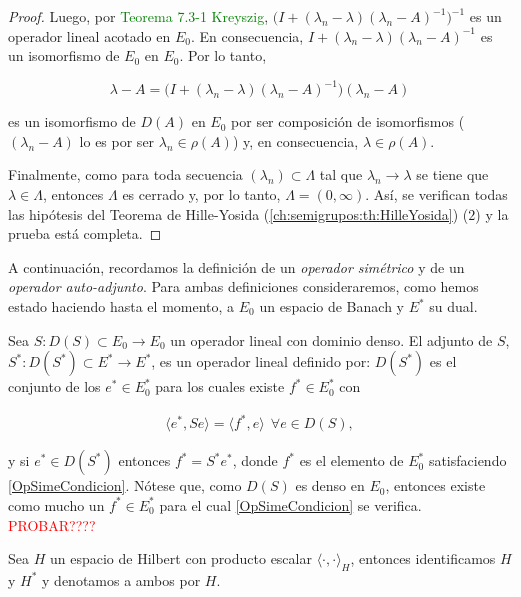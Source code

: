 \begin{proof}
    Luego, por \textcolor{green}{Teorema 7.3-1 Kreyszig}, $\big(I + (\lambda_n - \lambda)(\lambda_n - A)^{-1}\big)^{-1}$ es un operador lineal acotado en $E_0$. En consecuencia, $I + (\lambda_n - \lambda)(\lambda_n - A)^{-1}$ es un isomorfismo de $E_0$ en $E_0$. Por lo tanto,

    \[\lambda - A = \big(I + (\lambda_n - \lambda)(\lambda_n - A)^{-1} \big)(\lambda_n - A)\]

    es un isomorfismo de $D(A)$ en $E_0$ por ser composición de isomorfismos ($(\lambda_n - A)$ lo es por ser $\lambda_n \in \rho(A)$) y, en consecuencia, $\lambda \in \rho(A)$.

    Finalmente, como para toda secuencia $(\lambda_n) \subset \Lambda$ tal que $\lambda_n \rightarrow \lambda$ se tiene que $\lambda \in \Lambda$, entonces $\Lambda$ es cerrado y, por lo tanto, $\Lambda = (0, \infty)$. Así, se verifican todas las hipótesis del Teorema de Hille-Yosida (\ref{ch:semigrupos:th:HilleYosida}) ($2$) y la prueba está completa.
\end{proof}

A continuación, recordamos la definición de un \textit{operador simétrico} y de un \textit{operador auto-adjunto}. Para ambas definiciones consideraremos, como hemos estado haciendo hasta el momento, a $E_0$ un espacio de Banach y $E^*$ su dual.\\

\begin{Definicion}
    \label{ch:semigrupos:def:OpSimetrico}
    Sea $S : D(S) \subset E_0 \rightarrow E_0$ un operador lineal con dominio denso. El adjunto de $S$, $S^* : D(S^*) \subset E^* \rightarrow E^*$, es un operador lineal definido por: $D(S^*)$ es el conjunto de los $e^* \in E_0^*$ para los cuales existe $f^* \in E_0^*$ con

    \begin{align}
        \label{OpSimeCondicion}
        \langle e^*, Se \rangle = \langle f^*, e \rangle \ \ \forall e \in D(S),
    \end{align}

    y si $e^* \in D(S^*)$ entonces $f^* = S^* e^*$, donde $f^*$ es el elemento de $E_0^*$ satisfaciendo \eqref{OpSimeCondicion}. Nótese que, como $D(S)$ es denso en $E_0$, entonces existe como mucho un $f^* \in E_0^*$ para el cual \eqref{OpSimeCondicion} se verifica. \textcolor{red}{PROBAR????}

    Sea $H$ un espacio de Hilbert con producto escalar $\langle \cdot, \cdot \rangle_H$, entonces identificamos $H$ y $H^*$ y denotamos a ambos por $H$.
\end{Definicion}


